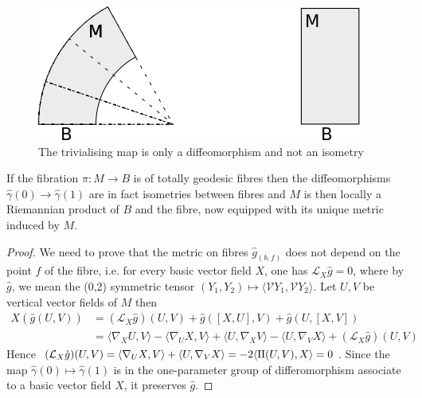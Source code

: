 \begin{figure}[htbp]
\centering
\includegraphics[width=.9\linewidth]{../img/RiemannFibration.png}
\caption{The trivialising map is only a diffeomorphism and not an isometry \label{trivalising-map}}
\end{figure}





\begin{theorem}[Hermann]
\label{thm:Hermann}
If the fibration \(\pi: M \longrightarrow B\) is
of totally geodesic fibres then the diffeomorphisms \(\hat\gamma(0) \longrightarrow
\hat\gamma(1)\) are in fact isometries between fibres and \(M\) is then locally a
Riemannian product of \(B\) and the fibre, now equipped with its unique
metric induced by \(M\).
\end{theorem}

\begin{proof}
We need to prove that the metric on fibres \(\hat g_{(b,f)}\) does not depend on the point
\(f\) of the fibre, i.e. for every basic vector field \(X\), one has \(\mathcal{L}_X\hat g=0\), where by \(\hat g\), we mean the (0,2) symmetric tensor \((Y_1, Y_2)\mapsto \langle
\mathcal{V}Y_1, \mathcal{V}Y_2 \rangle\). Let \(U,V\) be vertical vector fields of \(M\) then
\begin{equation*}
\label{eq:calcul-Hermann}
\begin{split}
X(\hat g(U,V)) &= (\mathcal{L}_X \hat g)(U,V) + \hat g([X,U],V) + \hat g(U, [X,V])\\
       	       &=  \langle \nabla_X U, V \rangle - \langle \nabla_U X, V \rangle + \langle U, \nabla_X V \rangle - \langle U, \nabla_V X \rangle + (\mathcal{L}_X\hat g)(U,V)
\end{split}   
\end{equation*}
Hence \((\mathcal{L}_X \hat g)(U,V) = \langle \nabla_U X, V\rangle + \langle U, \nabla_V
X \rangle = -2 \langle \sff(U,V), X \rangle = 0\). Since the map \(\hat\gamma(0) \mapsto \hat\gamma(1)\) is in the one-parameter group of differomorphism
associate to a basic vector field \(X\), it preserves \(\hat g\).
\end{proof}


